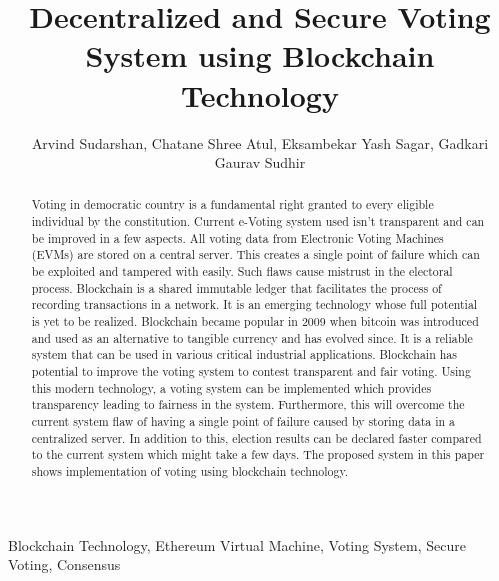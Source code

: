 \documentclass[10pt,final,journal,a4paper,oneside,twocolumn]{IEEEtran}
\title{Decentralized and Secure Voting System using Blockchain Technology}
\author{
  Arvind Sudarshan,
  Chatane Shree Atul,
  Eksambekar Yash Sagar,
  Gadkari Gaurav Sudhir
}
\begin{document}
	\maketitle

	\begin{abstract}
		Voting in democratic country is a fundamental right granted to every eligible individual by the constitution. Current e-Voting system used isn’t transparent and can be improved in a few aspects. All voting data from Electronic Voting Machines (EVMs) are stored on a central server. This creates a single point of failure which can be exploited and tampered with easily. Such flaws cause mistrust in the electoral process. Blockchain is a shared immutable ledger that facilitates the process of recording transactions in a network. It is an emerging technology whose full potential is yet to be realized. Blockchain became popular in 2009 when bitcoin was introduced and used as an alternative to tangible currency and has evolved since. It is a reliable system that can be used in various critical industrial applications. Blockchain has potential to improve the voting system to contest transparent and fair voting. Using this modern technology, a voting system can be implemented which provides transparency leading to fairness in the system. Furthermore, this will overcome the current system flaw of having a single point of failure caused by storing data in a centralized server. In addition to this, election results can be declared faster compared to the current system which might take a few days. The proposed system in this paper shows implementation of voting using blockchain technology.
	\end{abstract}

	\begin{IEEEkeywords}
		Blockchain Technology, Ethereum Virtual Machine, Voting System, Secure Voting, Consensus
	\end{IEEEkeywords}
	
\end{document}
